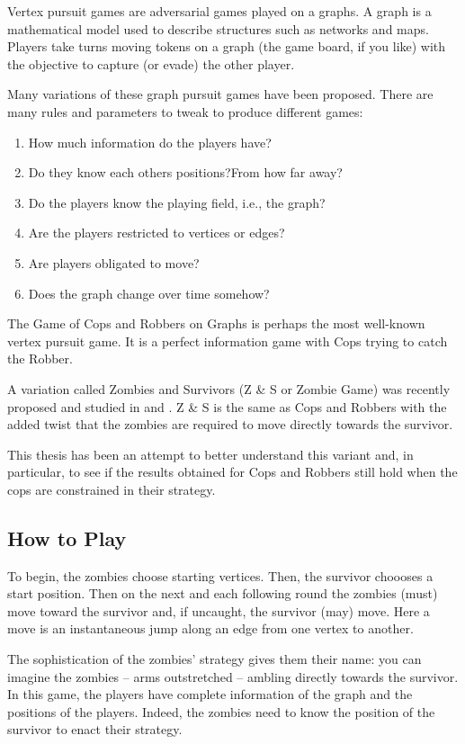 
Vertex pursuit games are adversarial games played on a graphs.
A graph is a mathematical model used to describe structures such as networks and
maps. Players take turns moving tokens on a graph (the game board, if you like) with
the objective to capture (or evade) the other player.

Many variations of these graph pursuit games have been proposed. There are many rules and
parameters to tweak to produce different games:
\begin{enumerate}
\item How much information do the players have?
\item Do they know each others positions?From how far away?
\item Do the players know the playing field, i.e., the graph?
\item Are the players restricted to vertices or edges?
\item Are players obligated to move?
\item Does the graph change over time somehow?
\end{enumerate}

The Game of Cops and Robbers on Graphs \cite{bonato2011game} is perhaps the most
well-known vertex pursuit game. It is a perfect information game with Cops trying
to catch the Robber.

A variation called Zombies and Survivors (Z \& S or Zombie Game) was recently proposed and studied in \cite{fitzpatrick2016deterministic} and \cite{fitzpatrick2018game}.
Z \& S is the same as Cops and Robbers with the added twist that the zombies are required to move directly towards the survivor.

This thesis has been an attempt to better understand this variant and, in particular,
to see if the results obtained for Cops and Robbers still hold when the cops
are constrained in their strategy.

\subsection{How to Play}

To begin, the zombies choose starting vertices.
Then, the survivor choooses a start position.
Then on the next and each following round the zombies (must) move toward the survivor
and, if uncaught, the survivor (may) move. Here a move is an instantaneous jump
along an edge from one vertex to another.

The sophistication of the zombies' strategy gives them their name:
you can imagine the zombies -- arms outstretched -- ambling directly towards the survivor.
In this game, the players have complete information of the graph and the positions of the players. Indeed, the zombies need to know the position of the survivor to enact
their strategy.

